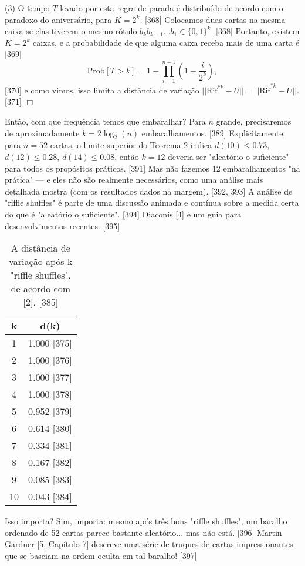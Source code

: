 \documentclass[a4paper]{article}
\begin{document}
(3) O tempo $T$ levado por esta regra de parada é distribuído de acordo com o paradoxo do aniversário, para $K = 2^k$. [368] Colocamos duas cartas na mesma caixa se elas tiverem o mesmo rótulo $b_k b_{k-1} \dots b_1 \in \{0,1\}^k$. [368] Portanto, existem $K=2^k$ caixas, e a probabilidade de que alguma caixa receba mais de uma carta é [369]
$$ \text{Prob}[T > k] = 1 - \prod_{i=1}^{n-1} \left(1 - \frac{i}{2^k}\right), $$ [370]
e como vimos, isso limita a distância de variação $||\text{Rif}^{*k} - U|| = ||\overline{\text{Rif}}^{*k} - U||$. [371] \hfill $\Box$

\newpage

Então, com que frequência temos que embaralhar? Para $n$ grande, precisaremos de aproximadamente $k = 2 \log_2(n)$ embaralhamentos. [389] Explicitamente, para $n=52$ cartas, o limite superior do Teorema 2 indica $d(10) \le 0.73$, $d(12) \le 0.28$, $d(14) \le 0.08$, então $k=12$ deveria ser "aleatório o suficiente" para todos os propósitos práticos. [391] Mas não fazemos 12 embaralhamentos "na prática" — e eles não são realmente necessários, como uma análise mais detalhada mostra (com os resultados dados na margem). [392, 393] A análise de "riffle shuffles" é parte de uma discussão animada e contínua sobre a medida certa do que é "aleatório o suficiente". [394] Diaconis [4] é um guia para desenvolvimentos recentes. [395]

\begin{table}[h!]
    \centering
    \caption{A distância de variação após k "riffle shuffles", de acordo com [2]. [385]}
    \begin{tabular}{cc}
        \hline
        k & d(k) \\
        \hline
        1 & 1.000 [375] \\
        2 & 1.000 [376] \\
        3 & 1.000 [377] \\
        4 & 1.000 [378] \\
        5 & 0.952 [379] \\
        6 & 0.614 [380] \\
        7 & 0.334 [381] \\
        8 & 0.167 [382] \\
        9 & 0.085 [383] \\
        10 & 0.043 [384] \\
        \hline
    \end{tabular}
\end{table}

Isso importa? Sim, importa: mesmo após três bons "riffle shuffles", um baralho ordenado de 52 cartas parece bastante aleatório... mas não está. [396] Martin Gardner [5, Capítulo 7] descreve uma série de truques de cartas impressionantes que se baseiam na ordem oculta em tal baralho! [397]
\end{document}
